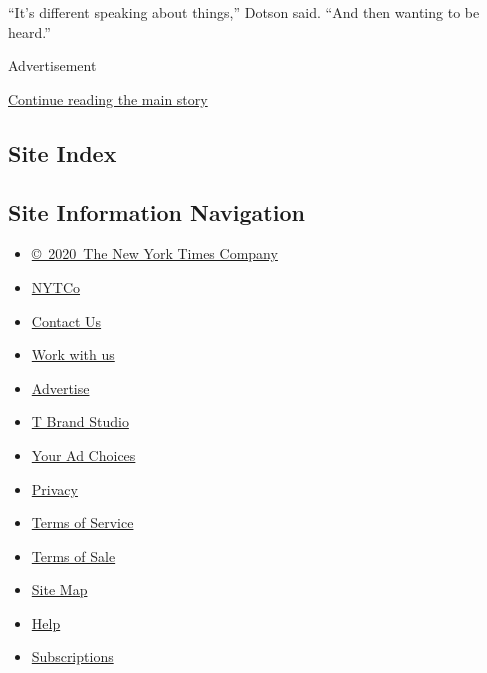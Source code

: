 ``It's different speaking about things,'' Dotson said. ``And then
wanting to be heard.''

Advertisement

\protect\hyperlink{after-bottom}{Continue reading the main story}

\hypertarget{site-index}{%
\subsection{Site Index}\label{site-index}}

\hypertarget{site-information-navigation}{%
\subsection{Site Information
Navigation}\label{site-information-navigation}}

\begin{itemize}
\tightlist
\item
  \href{https://help.nytimes.com/hc/en-us/articles/115014792127-Copyright-notice}{©~2020~The
  New York Times Company}
\end{itemize}

\begin{itemize}
\tightlist
\item
  \href{https://www.nytco.com/}{NYTCo}
\item
  \href{https://help.nytimes.com/hc/en-us/articles/115015385887-Contact-Us}{Contact
  Us}
\item
  \href{https://www.nytco.com/careers/}{Work with us}
\item
  \href{https://nytmediakit.com/}{Advertise}
\item
  \href{http://www.tbrandstudio.com/}{T Brand Studio}
\item
  \href{https://www.nytimes.com/privacy/cookie-policy\#how-do-i-manage-trackers}{Your
  Ad Choices}
\item
  \href{https://www.nytimes.com/privacy}{Privacy}
\item
  \href{https://help.nytimes.com/hc/en-us/articles/115014893428-Terms-of-service}{Terms
  of Service}
\item
  \href{https://help.nytimes.com/hc/en-us/articles/115014893968-Terms-of-sale}{Terms
  of Sale}
\item
  \href{https://spiderbites.nytimes.com}{Site Map}
\item
  \href{https://help.nytimes.com/hc/en-us}{Help}
\item
  \href{https://www.nytimes.com/subscription?campaignId=37WXW}{Subscriptions}
\end{itemize}
